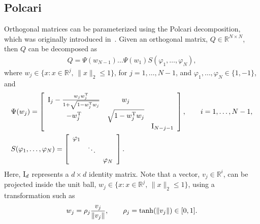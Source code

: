 \documentclass[12pt]{article}
\begin{document}
\subsection{Polcari}

Orthogonal matrices can be parameterized using the
Polcari decomposition, which was originally introduced in~\cite{polcari}.
Given an orthogonal matrix, $Q\in\mathbb{R}^{N\times N}$,
then $Q$ can be decomposed as
\begin{align}
  Q = \Psi(w_{N-1}) \hdots \Psi(w_1) S(\varphi_1, \dots, \varphi_N),
  \label{eq:polcarisigned}
\end{align}
where $w_j \in \{x: x\in \mathbb{R}^{j},\, \|x\|_2 \le 1\}$, for $j=1,\dots,N-1$,
and $\varphi_1, \dots, \varphi_N \in \{1, -1 \}$, and 
\begin{align*}
  &\Psi(w_j) = 
  \left[\begin{array}{ccc}
          {\rm I}_{j} - \frac{w_j w_j^{\rm T}}{1 + \sqrt{1 - w_j^{\rm T} w_j}} & w_j & \\
          - w_j^{\rm T} & \sqrt{1 - w_j^{\rm T} w_j} & \\
                                                             && {\rm I}_{N-j-1}
        \end{array}\right], \qquad i=1, \dots, N-1, \\
  &S(\varphi_1, \dots, \varphi_N) = \left[\begin{array}{ccc}
                                            \varphi_1 \\
                                           & \ddots \\
                                           && \varphi_N
                                         \end{array}\right].
\end{align*}
%
Here, ${\rm I}_d$ represents a $d \times d$ identity matrix.
Note that a vector, $v_j \in \mathbb{R}^i$, can be projected inside the unit ball,
$w_j \in \{x: x\in \mathbb{R}^{j},\, \|x\|_2 \le 1\}$, using a transformation such as
\begin{align*}
  w_j = \rho_j \frac{v_j}{\|v_j\|}, \qquad \rho_j = {\rm tanh}(\|v_j\|) \in [0, 1].
\end{align*}
%
\end{document}
